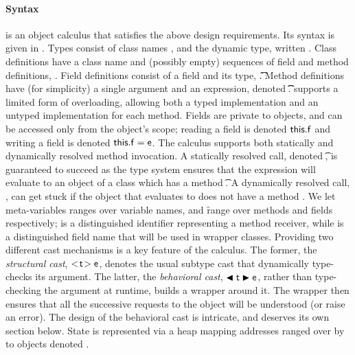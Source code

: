 \documentclass[runnningheads]{tex/llncs}
\begin{document}
\paragraph{Syntax}  
\kafka is an object calculus that satisfies the above design
requirements. Its syntax is given in .  Types consist of class
names \C, \D and the dynamic type, written \any.  Class definitions have a
class name and (possibly empty) sequences of field and method definitions,
\Class{}. Field definitions consist of a field and its
type, \Fdef\f\t. Method definitions have (for simplicity) a single argument
and an expression, denoted \Mdef\m\x\t\t\e.  \kafka supports a limited form
of overloading, allowing both a typed implementation and an untyped
implementation for each method.  Fields are private to objects, and can be
accessed only from the object's scope; reading a field is denoted
\(\FRead\f\) and writing a field is denoted \(\FWrite\f\e \).  The calculus
supports both statically and dynamically resolved method invocation.  A
statically resolved call, denoted \KCall\e\m\ep\t\tp, is guaranteed to
succeed as the type system ensures that the expression \e will evaluate to
an object of a class which has a method \Mtype\m\t\tp. A dynamically
resolved call, \DynCall\e\m\ep, can get stuck if the object that \e
evaluates to does not have a method \Mtype\m\any\any.  We let meta-variables
\x ranges over variable names, \m and \f range over methods and fields
respectively; \this is a distinguished identifier representing a method
receiver, while \that is a distinguished field name that will be used in
wrapper classes.  Providing two different cast mechanisms is a key feature
of the calculus.  The former, the \emph{structural cast}, \(\SubCast\t\e\),
denotes the usual subtype cast that dynamically type-checks its argument.
The latter, the \emph{behavioral cast}, \(\BehCast\t\e\), rather than
type-checking the argument at runtime, builds a wrapper around it.  The
wrapper then ensures that all the successive requests to the object will be
understood (or raise an error). The design of the behavioral cast is
intricate, and deserves its own section below.  State is represented via a
heap \s mapping addresses ranged over by \a to objects
denoted \hspace{-1mm}\obj{}.
\end{document}
